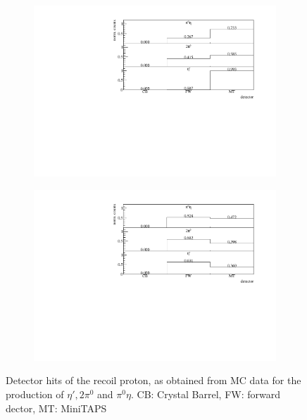 \begin{figure}[htbp]
	\centering
	\begin{subfigure}{\linewidth}
			\includegraphics[width=\linewidth]{../figs/hydrogen/p_det/p_det0.pdf}
	\end{subfigure}
	\begin{subfigure}{\linewidth}
	\includegraphics[width=\linewidth]{../figs/hydrogen/p_det/p_det1.pdf}
\end{subfigure}

	\caption{Detector hits of the recoil proton, as obtained from MC data for the production of $\eta',2\pi^0$ and $\pi^0\eta$. CB: Crystal Barrel, FW: forward dector, MT: MiniTAPS}
	\label{fig:p_det}
	
\end{figure}
